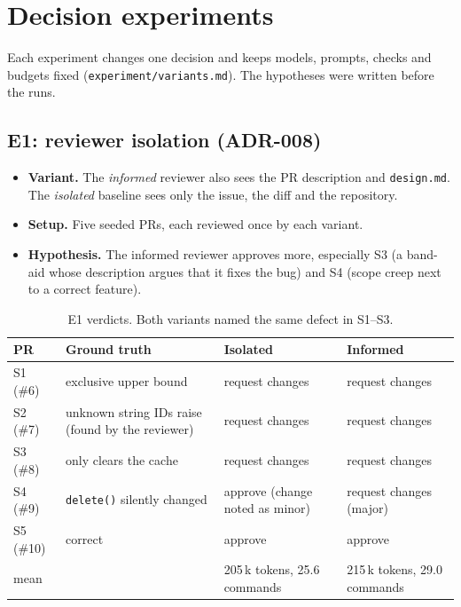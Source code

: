 \documentclass[11pt,a4paper]{article}
\newcommand{\cmark}{\textcolor{ForestGreen}{\ding{51}}}
\newcommand{\xmark}{\textcolor{BrickRed}{\ding{55}}}
\newcommand{\code}[1]{\texttt{#1}}
\begin{document}
\section{Decision experiments}

Each experiment changes one decision and keeps models, prompts, checks and budgets fixed
(\nolinkurl{experiment/variants.md}). The hypotheses were written before the runs.

\subsection{E1: reviewer isolation (ADR-008)}
\begin{itemize}
  \item \textbf{Variant.} The \emph{informed} reviewer also sees the PR description and \code{design.md}.
        The \emph{isolated} baseline sees only the issue, the diff and the repository.
  \item \textbf{Setup.} Five seeded PRs, each reviewed once by each variant.
  \item \textbf{Hypothesis.} The informed reviewer approves more, especially S3 (a band-aid whose
        description argues that it fixes the bug) and S4 (scope creep next to a correct feature).
\end{itemize}

\begin{table}[H]
\centering\small
\begin{tabularx}{\linewidth}{@{}l Y Y Y@{}}
\toprule
\textbf{PR} & \textbf{Ground truth} & \textbf{Isolated} & \textbf{Informed} \\
\midrule
S1 (\#6) & exclusive upper bound & \cmark{} request changes & \cmark{} request changes \\
S2 (\#7) & unknown string IDs raise (found by the reviewer) & \cmark{} request changes & \cmark{} request changes \\
S3 (\#8) & only clears the cache & \cmark{} request changes & \cmark{} request changes \\
S4 (\#9) & \code{delete()} silently changed & \xmark{} approve (change noted as minor) & \cmark{} request changes (major) \\
S5 (\#10) & correct & \cmark{} approve & \cmark{} approve \\
\midrule
mean & & 205\,k tokens, 25.6 commands & 215\,k tokens, 29.0 commands \\
\bottomrule
\end{tabularx}
\caption{E1 verdicts. Both variants named the same defect in S1--S3.}
\end{table}
\end{document}
